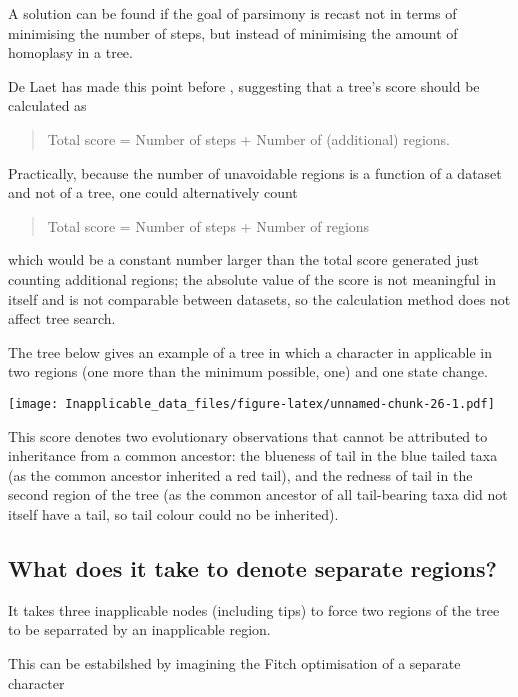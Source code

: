 \documentclass[]{book}
\theoremstyle{definition}
\theoremstyle{definition}
\theoremstyle{definition}
\theoremstyle{remark}
\begin{document}
A solution can be found if the goal of parsimony is recast not in terms
of minimising the number of steps, but instead of minimising the amount
of homoplasy in a tree.

De Laet has made this point before
\citetext{\citealp{DeLaet2005}; \citeyear{DeLaet2015}}, suggesting that
a tree's score should be calculated as

\begin{quote}
Total score = Number of steps + Number of (additional) regions.
\end{quote}

Practically, because the number of unavoidable regions is a function of
a dataset and not of a tree, one could alternatively count

\begin{quote}
Total score = Number of steps + Number of regions
\end{quote}

which would be a constant number larger than the total score generated
just counting additional regions; the absolute value of the score is not
meaningful in itself and is not comparable between datasets, so the
calculation method does not affect tree search.

The tree below gives an example of a tree in which a character in
applicable in two regions (one more than the minimum possible, one) and
one state change.

\texttt{[image: Inapplicable\_data\_files/figure-latex/unnamed-chunk-26-1.pdf]}

This score denotes two evolutionary observations that cannot be
attributed to inheritance from a common ancestor: the blueness of tail
in the blue tailed taxa (as the common ancestor inherited a red tail),
and the redness of tail in the second region of the tree (as the common
ancestor of all tail-bearing taxa did not itself have a tail, so tail
colour could no be inherited).

\subsection{What does it take to denote separate
regions?}\label{what-does-it-take-to-denote-separate-regions}

It takes three inapplicable nodes (including tips) to force two regions
of the tree to be separrated by an inapplicable region.

This can be estabilshed by imagining the Fitch optimisation of a
separate character
\end{document}
